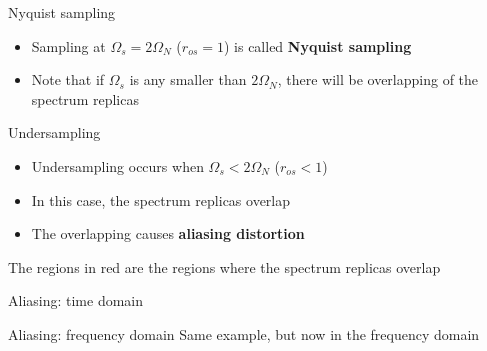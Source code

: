 \documentclass[10pt]{beamer}
\newcommand\PlotSampledSpectrum[4]{%
	\def\fs{#2}%
	\def\fmax{#3}%
	\def\ros{#4}%
}
\begin{document}
\begin{frame}{Nyquist sampling}
\begin{itemize}
	\item Sampling at $\Omega_s = 2\Omega_N$ ($r_{os} = 1$) is called \textbf{Nyquist sampling}
	\item Note that if $\Omega_s$ is any smaller than $2\Omega_N$, there will be overlapping of the spectrum replicas
	
\begin{center}
		\resizebox{0.9\linewidth}{!}{\PlotSampledSpectrum{figs/oversampling_example.tex}{5}{2.5}{$\Omega_s = 2\Omega_N$}}
\end{center}
\end{itemize}
\end{frame}


\begin{frame}{Undersampling}
\begin{itemize}
	\item Undersampling occurs when $\Omega_s < 2\Omega_N$ ($r_{os} < 1$)
	\item In this case, the spectrum replicas overlap
	\item The overlapping causes \textbf{aliasing distortion}
\end{itemize}

\begin{center}
	\resizebox{0.9\linewidth}{!}{}
\end{center}
The regions in red are the regions where the spectrum replicas overlap
\end{frame}

\begin{frame}{Aliasing: time domain}
\begin{center}
	\resizebox{0.7\linewidth}{!}{}
\end{center}
\end{frame}

\begin{frame}{Aliasing: frequency domain}
Same example, but now in the frequency domain
\begin{center}
	\resizebox{0.9\linewidth}{!}{}
\end{center}


\end{frame}
\end{document}
